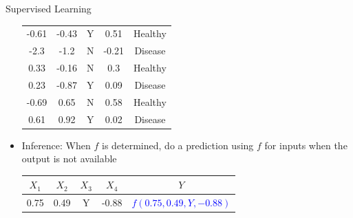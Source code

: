 \begin{frame}[allowframebreaks]{Supervised Learning}
\begin{itemize}
\begin{center}
\begin{tabular}{*{4}{c} c}
        \midrule
        \rowcolor{blue!20} -0.61 & -0.43 & Y & 0.51 & Healthy \\
        \rowcolor{blue!20} -2.3 & -1.2 & N & -0.21 & Disease \\
        \rowcolor{blue!20} 0.33 & -0.16 & N & 0.3 & Healthy \\
        \rowcolor{blue!20} 0.23 & -0.87 & Y & 0.09 & Disease \\
        \rowcolor{red!20} -0.69 & 0.65 & N & 0.58 & Healthy \\
        \rowcolor{red!20} 0.61 & 0.92 & Y & 0.02 & Disease \\
        \bottomrule
      \end{tabular}
    \end{center}
    \item Inference: When $f$ is determined, do a prediction using $f$ for inputs when the output is not available
    \begin{center}
      \begin{tabular}{*{4}{c} c}
        \toprule
        
        $X_1$ & $X_2$ & $X_3$ & $X_4$ & $Y$  \\
        \midrule
        0.75 & 0.49 & Y & -0.88 & \textcolor{blue}{$f(0.75, 0.49, Y, -0.88)$} \\
        \bottomrule
        \end{tabular}
    \end{center}
  \end{itemize}

\end{frame}

